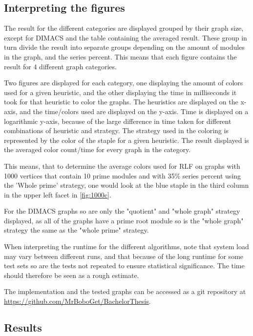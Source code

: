 \documentclass[a4paper]{article}
\begin{document}
\subsection{Interpreting the figures}

The result for the different categories are displayed grouped by their graph
size, except for DIMACS and the table containing the averaged result. These
group in turn divide the result into separate groups depending on the amount of
modules in the graph, and the series percent. This means that each figure
contains the result for 4 different graph categories.

Two figures are displayed for each category, one displaying the amount of
colors used for a given heuristic, and the other displaying the time in
milliseconds it took for that heuristic to color the graphs. The heuristics are
displayed on the x-axis, and the time/colors used are displayed on the y-axis.
Time is displayed on a logarithmic y-axis, because of the large difference in
time taken for different combinations of heuristic and strategy. The strategy
used in the coloring is represented by the color of the staple for a given
heuristic. The result displayed is the averaged color count/time for every
graph in the category.

This means, that to determine the average colors used for RLF on graphs with
1000 vertices that contain 10 prime modules and with 35\% series percent using
the 'Whole prime' strategy, one would look at the blue staple in the third
column in the upper left facet in \autoref{fig:1000c}.

For the DIMACS graphs so are only the "quotient" and "whole graph" strategy displayed,
as all of the graphs have a prime root module so is the "whole graph" strategy
the same as the "whole prime" strategy.

When interpreting the runtime for the different algorithms, note
that system load may vary between different runs, and that because of
the long runtime for some test sets so are the tests not repeated to ensure
statistical significance. The time should therefore be seen as a rough
estimate.

The implementation and the tested graphs can be accessed as a git repository 
at \url{https://github.com/MrBoboGet/BachelorThesis}.

\subsection{Results}
\newpage
\end{document}
